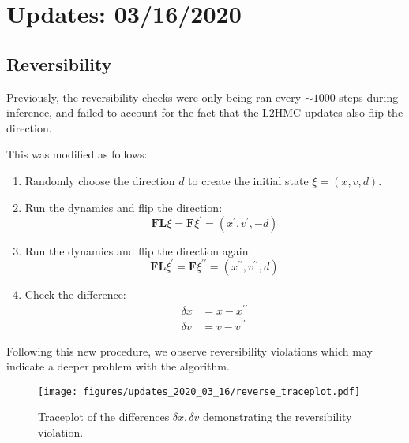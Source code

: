 \section{Updates: 03/16/2020}%
\label{sec:updates_2020_03_16}
\subsection{Reversibility}%
\label{subsec:reversibility}
Previously, the reversibility checks were only being ran every \(\sim 1000\)
steps during inference, and failed to account for the fact that the L2HMC
updates also flip the direction.

This was modified as follows:
%
\begin{enumerate}
  \item Randomly choose the direction \(d\) to create the initial state
    \(\xi = (x, v, d)\).
  \item Run the dynamics and flip the direction:
    \begin{equation}
      \mathbf{FL} \xi = \mathbf{F}\xi^{\prime} = (x^{\prime}, v^{\prime}, - d)
    \end{equation}
  \item Run the dynamics and flip the direction again:
    \begin{equation}
      \mathbf{FL} \xi^{\prime} = \mathbf{F} \xi^{\prime\prime} =
      (x^{\prime\prime}, v^{\prime\prime}, d)
  \end{equation}
  \item Check the difference:
    \begin{align}
      \delta x &= x - x^{\prime\prime} \\
      \delta v &= v - v^{\prime\prime}
    \end{align}
\end{enumerate}
%
Following this new procedure, we observe reversibility violations which may
indicate a deeper problem with the algorithm.
%
\begin{figure}[htpb!]
  \centering
  \texttt{[image: figures/updates\_2020\_03\_16/reverse\_traceplot.pdf]}
  \caption{Traceplot of the differences \(\delta x, \delta v\) demonstrating
  the reversibility violation.}
\end{figure}
%
%
%

